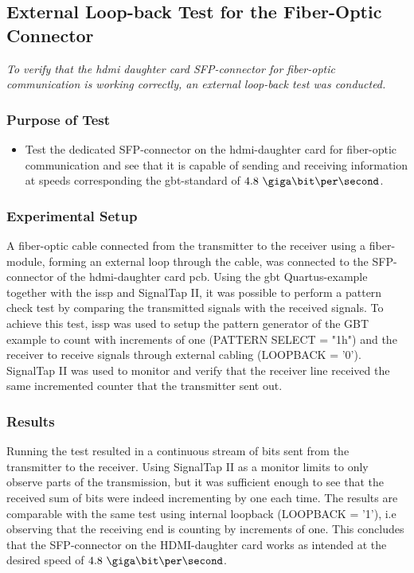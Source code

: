 \documentclass[main.tex]{subfiles}
\begin{document}
\subsection{External Loop-back Test for the Fiber-Optic Connector} \label{sec:exlooptest}

\textit{To verify that the \gls{hdmi} daughter card SFP-connector for fiber-optic communication is working correctly, an external loop-back test was conducted.}

\subsubsection{Purpose of Test}
\begin{itemize}\setlength{\itemsep}{10pt}

\item Test the dedicated SFP-connector on the \gls{hdmi}-daughter card for fiber-optic communication and see that it is capable of sending and receiving information at speeds corresponding the \gls{gbt}-standard of $4.8~\giga\bit\per\second$. 
\end{itemize}

\subsubsection{Experimental Setup}
A fiber-optic cable connected from the transmitter to the receiver using a fiber-module, forming an external loop through the cable, was connected to the SFP-connector of the \gls{hdmi}-daughter card \gls{pcb}. Using the \gls{gbt} Quartus-example together with the \gls{issp} and SignalTap II, it was possible to perform a pattern check test by comparing the transmitted signals with the received signals. To achieve this test, \gls{issp} was used to setup the pattern generator of the GBT example to count with increments of one (PATTERN SELECT = "1h") and the receiver to receive signals through external cabling (LOOPBACK = '0'). SignalTap II was used to monitor and verify that the receiver line received the same incremented counter that the transmitter sent out.

\subsubsection{Results}
Running the test resulted in a continuous stream of bits sent from the transmitter to the receiver. Using SignalTap II as a monitor limits to only observe parts of the transmission, but it was sufficient enough to see that the received sum of bits were indeed incrementing by one each time. The results are comparable with the same test using internal loopback (LOOPBACK = '1'), i.e observing that the receiving end is counting by increments of one. This concludes that the SFP-connector on the HDMI-daughter card works as intended at the desired speed of $4.8~\giga\bit\per\second$. %
\end{document}

